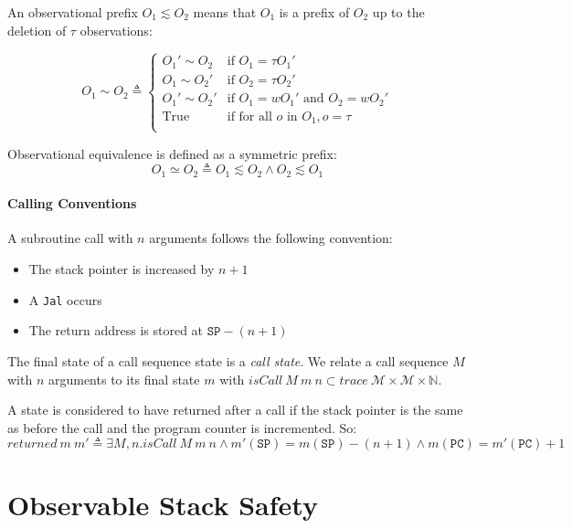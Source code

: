 \documentclass{article}
\begin{document}
    An observational prefix \(O_1 \lesssim O_2\) means that \(O_1\) is a prefix of \(O_2\) up to the deletion
    of \(\tau\) observations:

    \[O_1 \sim O_2 \triangleq
      \begin{cases}
        O_1' \sim O_2 & \text{if } O_1 = \tau O_1' \\
        O_1 \sim O_2' & \text{if } O_2 = \tau O_2' \\
        O_1' \sim O_2' & \text{if } O_1 = w O_1' \text{ and } O_2 = w O_2' \\
        \text{True} & \text{if for all } o \text{ in } O_1, o = \tau \\
      \end{cases}\]

    Observational equivalence is defined as a symmetric prefix:
    \[O_1 \simeq O_2 \triangleq O_1 \lesssim O_2 \land O_2 \lesssim O_1\]

    \paragraph{Calling Conventions}

      A subroutine call with \(n\) arguments follows the following convention:

      \begin{itemize}
        \item The stack pointer is increased by \(n+1\)
        \item A {\tt Jal} occurs
        \item The return address is stored at \(\mathtt{SP} - (n+1)\)
      \end{itemize}

      The final state of a call sequence state is a {\it call state}. We relate a call sequence \(M\) with
      \(n\) arguments to its final state \(m\) with \(\mathit{isCall}\ M\ m\ n \subset \mathit{trace}\ \mathcal{M}
      \times \mathcal{M} \times \mathbb{N}\).

      A state is considered to have returned after a call if the stack pointer is the same as before the call
      and the program counter is incremented. So:
      \[\mathit{returned}\ m\ m' \triangleq \exists M,n . \mathit{isCall\ M\ m\ n} \land
        m'(\mathtt{SP}) = m(\mathtt{SP}) - (n+1) \land m(\mathtt{PC}) = m'(\mathtt{PC}) + 1\]
 
  \section{Observable Stack Safety}
\end{document}
